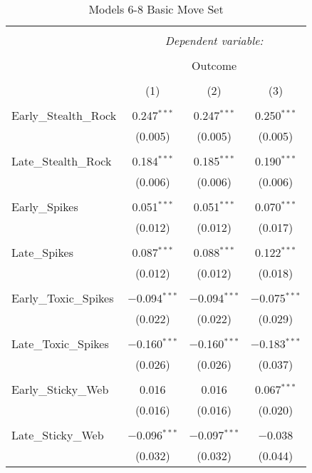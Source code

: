 \documentclass[12pt,twoside]{reedthesis}
\begin{document}
  \begin{table}[!htbp] \centering 
    \caption{Models 6-8 Basic Move Set} 
    \label{} 
  \begin{tabular}{@{\extracolsep{5pt}}lccc} 
  \\[-1.8ex]\hline 
  \hline \\[-1.8ex] 
   & \multicolumn{3}{c}{\textit{Dependent variable:}} \\ 
  \cline{2-4} 
  \\[-1.8ex] & \multicolumn{3}{c}{Outcome} \\ 
  \\[-1.8ex] & (1) & (2) & (3)\\ 
  \hline \\[-1.8ex] 
   Early\_Stealth\_Rock & 0.247$^{***}$ & 0.247$^{***}$ & 0.250$^{***}$ \\ 
    & (0.005) & (0.005) & (0.005) \\ 
    & & & \\ 
   Late\_Stealth\_Rock & 0.184$^{***}$ & 0.185$^{***}$ & 0.190$^{***}$ \\ 
    & (0.006) & (0.006) & (0.006) \\ 
    & & & \\ 
   Early\_Spikes & 0.051$^{***}$ & 0.051$^{***}$ & 0.070$^{***}$ \\ 
    & (0.012) & (0.012) & (0.017) \\ 
    & & & \\ 
   Late\_Spikes & 0.087$^{***}$ & 0.088$^{***}$ & 0.122$^{***}$ \\ 
    & (0.012) & (0.012) & (0.018) \\ 
    & & & \\ 
   Early\_Toxic\_Spikes & $-$0.094$^{***}$ & $-$0.094$^{***}$ & $-$0.075$^{***}$ \\ 
    & (0.022) & (0.022) & (0.029) \\ 
    & & & \\ 
   Late\_Toxic\_Spikes & $-$0.160$^{***}$ & $-$0.160$^{***}$ & $-$0.183$^{***}$ \\ 
    & (0.026) & (0.026) & (0.037) \\ 
    & & & \\ 
   Early\_Sticky\_Web & 0.016 & 0.016 & 0.067$^{***}$ \\ 
    & (0.016) & (0.016) & (0.020) \\ 
    & & & \\ 
   Late\_Sticky\_Web & $-$0.096$^{***}$ & $-$0.097$^{***}$ & $-$0.038 \\ 
    & (0.032) & (0.032) & (0.044) \\ 

\end{tabular}
\end{table}
\end{document}
